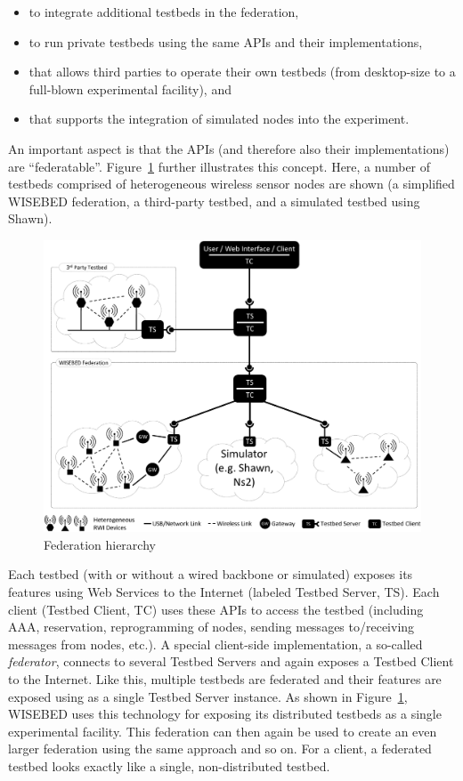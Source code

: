 \documentclass[a4paper,12pt]{article}
\begin{document}
\begin{itemize}
	\item to integrate additional testbeds in the federation, 
	\item to run private testbeds using the same APIs and their implementations,
	\item that allows third parties to operate their own testbeds (from desktop-size to a full-blown experimental facility), and 
	\item that supports the integration of simulated nodes into the experiment. 
\end{itemize}

An important aspect is that the APIs (and therefore also their implementations) are ``federatable''. Figure~\ref{fig:federation} further illustrates this concept. Here, a number of testbeds comprised of heterogeneous wireless sensor nodes are shown (a simplified WISEBED federation, a third-party testbed, and a simulated testbed using Shawn). 

 \begin{figure}[htb]
      \begin{center}
      \includegraphics[width=.9\textwidth]{fig/federation}
      \caption{Federation hierarchy}
      \label{fig:federation}
      \end{center}
\end{figure}

Each testbed (with or without a wired backbone or simulated) exposes its features using Web Services to the Internet (labeled Testbed Server, TS). Each client (Testbed Client, TC) uses these APIs to access the testbed (including AAA, reservation, reprogramming of nodes, sending messages to/receiving messages from nodes, etc.). A special client-side implementation, a so-called \emph{federator}, connects to several Testbed Servers and again exposes a Testbed Client to the Internet. Like this, multiple testbeds are federated and their features are exposed using as a single Testbed Server instance. As shown in Figure~\ref{fig:federation}, WISEBED uses this technology for exposing its distributed testbeds as a single experimental facility. This federation can then again be used to create an even larger federation using the same approach and so on. For a client, a federated testbed looks exactly like a single, non-distributed testbed. 
\end{document}

